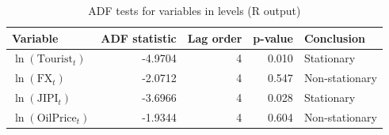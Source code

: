 \begin{table}[H]
\centering
\caption{ADF tests for variables in levels (R output)}
\label{tab:adf-levels}
\begin{tabular}{lrrrl}
\toprule
Variable & ADF statistic & Lag order & p-value & Conclusion \\
\midrule
$\ln(\mathrm{Tourist}_t)$ & -4.9704 & 4 & 0.010 & Stationary \\
$\ln(\mathrm{FX}_t)$ & -2.0712 & 4 & 0.547 & Non-stationary \\
$\ln(\mathrm{JIPI}_t)$ & -3.6966 & 4 & 0.028 & Stationary \\
$\ln(\mathrm{OilPrice}_t)$ & -1.9344 & 4 & 0.604 & Non-stationary \\
\bottomrule
\end{tabular}
\end{table}
